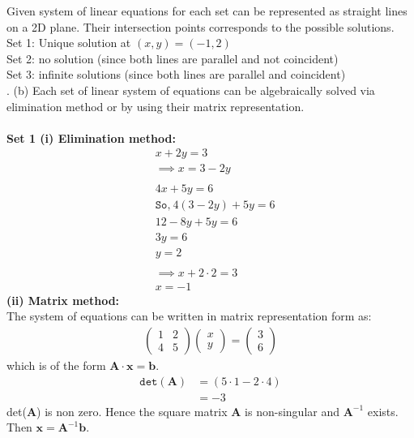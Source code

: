 \documentclass[12pt,letterpaper,fleqn]{article}
\theoremstyle{definition}
\begin{document}
	Given system of linear equations for each set can be represented
	as straight lines on a 2D plane. Their intersection points corresponds to the possible solutions.\\
	Set 1: Unique solution at $(x,y) = (-1, 2)$\\
	Set 2: no solution (since both lines are parallel and not coincident)\\
	Set 3: infinite solutions (since both lines are parallel and coincident)\\

.
(b) Each set of linear system of equations can be algebraically solved via elimination method or by using their matrix representation.\\
\\	
	\textbf{Set 1 (i) Elimination method:}
	\begin{equation*}
	\begin{split}
	&x + 2y = 3\\
	&\implies x = 3 -2y\\
	\\
	&4x + 5y = 6\\
	&\texttt{So,}~4(3- 2y) + 5y = 6\\
	&12 - 8y + 5y = 6\\
	&3y = 6 \\
	&y = 2\\
	\\
	&\implies x + 2\cdot 2 = 3\\
	&x = -1 
	\end{split}
	\end{equation*}
	\textbf{ (ii) Matrix method:}\\
	The system of equations can be written in matrix representation form as:
	\begin{equation*}
	\begin{split}
	\begin{pmatrix}
	1 &2\\
	4 &5
	\end{pmatrix}
	\begin{pmatrix}
	x\\
	y
	\end{pmatrix} =
	\begin{pmatrix}
	3\\
	6
	\end{pmatrix}
	\end{split}
	\end{equation*}
	which is of the form $\textbf{A}\cdot \textbf{x} = \textbf{b}$.
	\begin{equation*}
	\begin{split}
	\texttt{det}(\textbf{A}) &= ( 5 \cdot 1 - 2 \cdot 4 )\\
	&= -3
	\end{split}
	\end{equation*}
	det(\textbf{A}) is non zero. Hence the square matrix \textbf{A} is non-singular and $\textbf{A}^{-1}$ exists.\\
	Then $\textbf{x} = \textbf{A}^{-1}\textbf{b}$.
	
\end{document}
